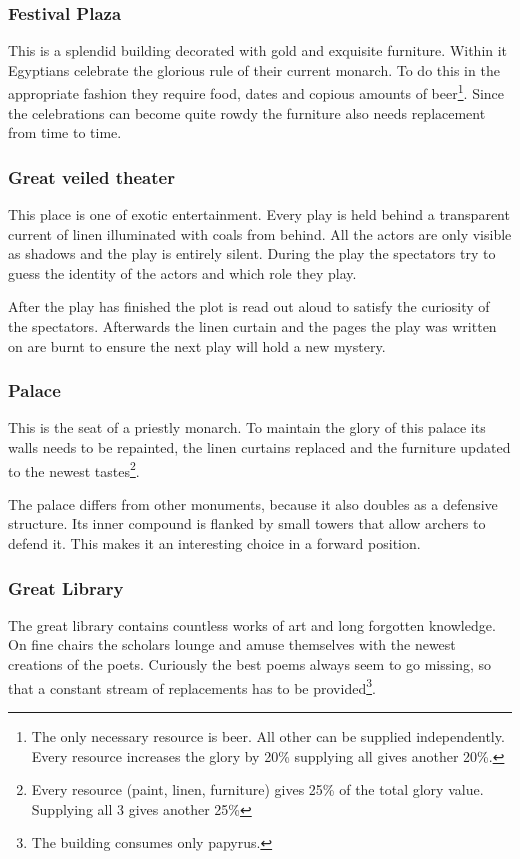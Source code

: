 \subsubsection{Festival Plaza}
This is a splendid building decorated with gold and exquisite furniture. Within
it \gls{Egyptians} celebrate the glorious rule of their current monarch. To do
this in the appropriate fashion they require food, dates and copious amounts of
beer\footnote{ The only necessary resource is beer. All other can be supplied
	independently. Every resource increases the glory by 20\% supplying all gives
	another 20\%. }. Since the celebrations can become quite rowdy the furniture
also needs replacement from time to time.

\subsubsection{Great veiled theater}
This place is one of exotic entertainment. Every play is held behind a
transparent current of linen illuminated with coals from behind. All the actors
are only visible as shadows and the play is entirely silent. During the play
the spectators try to guess the identity of the actors and which role they
play.

After the play has finished the plot is read out aloud to satisfy the curiosity
of the spectators. Afterwards the linen curtain and the pages the play was
written on are burnt to ensure the next play will hold a new mystery.

\subsubsection{Palace}
This is the seat of a priestly monarch. To maintain the glory of this palace
its walls needs to be repainted, the linen curtains replaced and the furniture
updated to the newest tastes\footnote{ Every resource (paint, linen, furniture)
	gives 25\% of the total glory value. Supplying all 3 gives another 25\% }.

The palace differs from other monuments, because it also doubles as a defensive
structure. Its inner compound is flanked by small towers that allow archers to
defend it. This makes it an interesting choice in a forward position.

\subsubsection{Great Library}
The great library contains countless works of art and long forgotten knowledge.
On fine chairs the scholars lounge and amuse themselves with the newest
creations of the poets. Curiously the best poems always seem to go missing, so
that a constant stream of replacements has to be provided\footnote{ The
	building consumes only papyrus. }.

